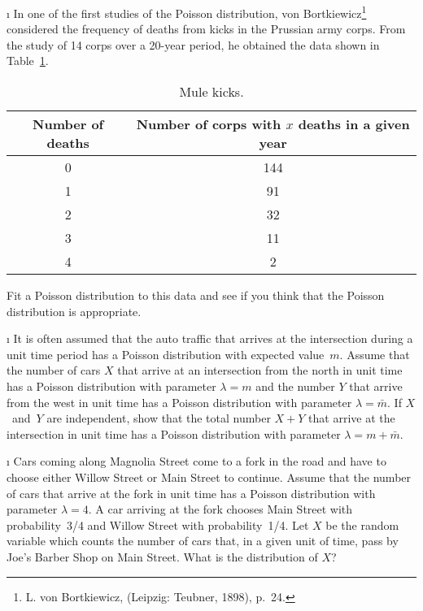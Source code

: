 \begin{LJSItem}
\i\label{exer 9.2.20} In one of the first studies of the Poisson distribution, von
Bortkiewicz\footnote{L. von Bortkiewicz,   (Leipzig: Teubner, 1898), p.\ 24.} considered the frequency of deaths from  kicks in the Prussian army corps.  From the study of 14 corps over a 20-year period, he
obtained the data shown in Table~\ref{table 5.5}.
\begin{table}
\centering
\begin{tabular}{|c|c|}
\hline Number of deaths & Number of corps with $x$ deaths in a given year \\ \hline 
0 & 144 \\
1 & \hspace{.1in}91 \\ 
2 & \hspace{.1in}32 \\ 
3 & \hspace{.12in}11 \\ 
4 & \hspace{.18in}2 \\ \hline
\end{tabular}
\caption{Mule kicks.}
\label{table 5.5}
\end{table}
Fit a Poisson distribution to this data and see if you think that the
Poisson distribution is appropriate.

\i\label{exer 9.2.21} It is often assumed that the auto traffic that arrives at the
intersection during a unit time period has a Poisson distribution with expected
value~$m$.  Assume that the number of cars $X$ that arrive at an intersection from the
north in unit time has a Poisson distribution with parameter $\lambda = m$ and the
number $Y$ that arrive from the west in unit time has a Poisson distribution with
parameter $\lambda = \bar m$.  If $X$~and~$Y$ are independent, show that the
total number $X + Y$ that arrive at the intersection in unit time has a Poisson
distribution with parameter $\lambda =  m + \bar m$.

\i\label{exer 9.2.22} Cars coming along Magnolia Street come to a fork in the road
and have to choose either Willow Street or Main Street to continue.  Assume that the
number of cars that arrive at the fork in unit time has a Poisson distribution with
parameter $\lambda = 4$.  A car arriving at the fork chooses Main Street with
probability~3/4 and Willow Street with probability~1/4.  Let $X$ be the random
variable which  counts the number of cars that, in a given unit of time, pass by Joe's
Barber Shop on Main Street.  What is the distribution of $X$?


\end{LJSItem}
